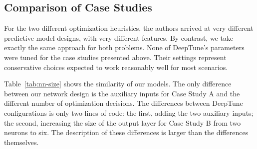 \subsection{Comparison of Case Studies}



For the two different optimization heuristics, the authors arrived at very
different predictive model designs, with very different features. By contrast,
we take exactly the same approach for both problems. None of DeepTune's
parameters were tuned for the case studies presented above. Their settings
represent conservative choices expected to work reasonably well for most
scenarios.

Table~\ref{tab:nn-size} shows the similarity of our models. The only difference
between our network design is the auxiliary inputs for Case Study A and the
different number of optimization decisions. The differences between DeepTune
configurations is only two lines of code: the first, adding the two auxiliary
inputs; the second, increasing the size of the output layer for Case Study B
from two neurons to six. The description of these differences is larger than the
differences themselves.
